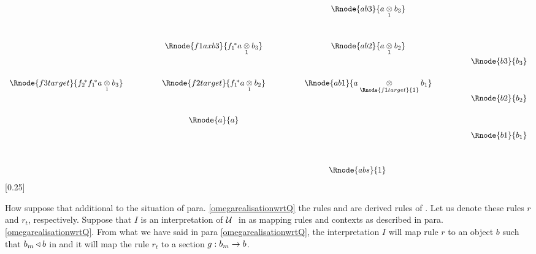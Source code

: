 \begin{displaymath}
\begin{array}{c p{1cm} c p {1cm} c  p{1cm} c}
                                                &&                                           && \Rnode{ab3}{\crossx{a}{b_3}{1}}                       \\[1.2cm]
                                                &&\Rnode{f1axb3}{\fonestar\crossx{a}{b_3}{1}}  && \Rnode{ab2}{\crossx{a}{b_2}{1}}                       \\[1.2cm]
 \Rnode{f3target}{\ftwostar\fonestar\crossx{a}{b_3}{1}} &&\Rnode{f2target}{\fonestar\crossx{a}{b_2}{1}}  && \Rnode{ab1}{\crossx{a}{b_1}{\Rnode{f1target}{1}}}     \\[1.2cm]
                                                &&\Rnode{a}{a}                               &&                                                       \\[-3.0cm]
																								&&                                           &&                         && \Rnode{b3}{b_3}             \\[1.2cm]
																								&&                                           &&                         && \Rnode{b2}{b_2}             \\[1.2cm]
																								&&                                           &&                         && \Rnode{b1}{b_1}             \\[1.1cm]
																								&&                                           && \Rnode{abs}{1} \ \ \ \ \ \ \ \ &&    
\end{array}
\end{displaymath}
[0.25]

How suppose that additional to the situation of para. \ref{omegarealisationwrtQ} the rules 
 and   are derived rules of \gatUw. 
Let us denote these rules $r$ and $r_t$, respectively. Suppose that $I$ is an interpretation of $\mathcal{U}\ $ in \catcw as mapping rules and contexts as described in para. \ref{omegarealisationwrtQ}.
From what we have said in para \ref{omegarealisationwrtQ}, the interpretation  $I$ will map rule $r$ to an object $b$ such that ${b_m \triangleleft b}$ in \catcw and it will map the rule $r_t$ to a section $g:b_m \rightarrow b$.  

